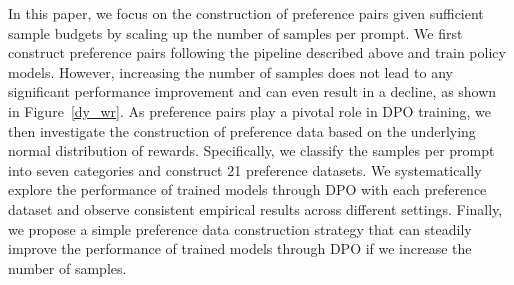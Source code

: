 
In this paper, we focus on the construction of preference pairs given sufficient sample budgets by scaling up the number of samples per prompt.
We first construct preference pairs following the pipeline described above and train policy models.
However, increasing the number of samples does not lead to any significant performance improvement and can even result in a decline, as shown in Figure~\ref{dy_wr}.
As preference pairs play a pivotal role in DPO training, we then investigate the construction of preference data based on the underlying normal distribution of rewards.
Specifically, we classify the samples per prompt into seven categories and construct 21 preference datasets. 
We systematically explore the performance of trained models through DPO with each preference dataset and observe consistent empirical results across different settings.
Finally, we propose a simple preference data construction strategy that can steadily improve the performance of trained models through DPO if we increase the number of samples.




